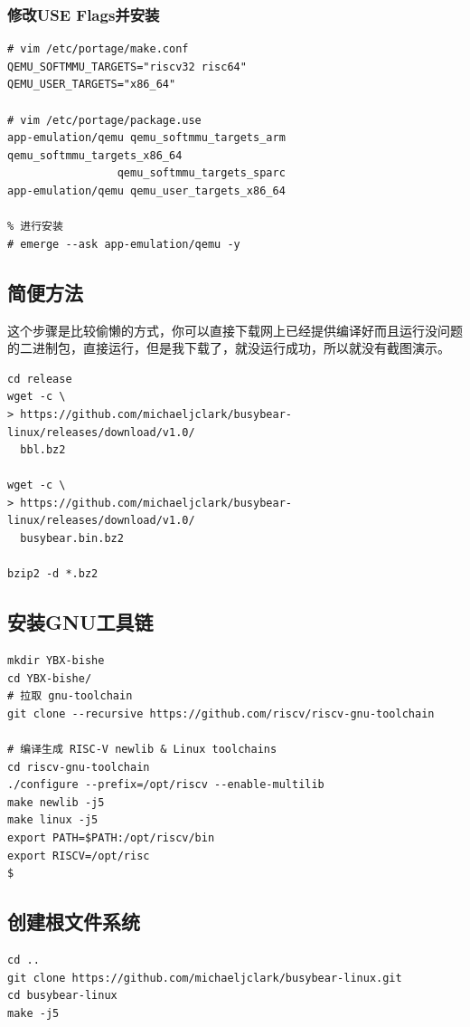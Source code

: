 \subsubsection{修改USE Flags并安装}
\begin{lstlisting}
# vim /etc/portage/make.conf
QEMU_SOFTMMU_TARGETS="riscv32 risc64"
QEMU_USER_TARGETS="x86_64"

# vim /etc/portage/package.use
app-emulation/qemu qemu_softmmu_targets_arm qemu_softmmu_targets_x86_64 
                 qemu_softmmu_targets_sparc
app-emulation/qemu qemu_user_targets_x86_64

% 进行安装
# emerge --ask app-emulation/qemu -y
\end{lstlisting}

\subsection{简便方法}
这个步骤是比较偷懒的方式，你可以直接下载网上已经提供编译好而且运行没问题的二进制包，直接运行，但是我下载了，就没运行成功，所以就没有截图演示。
\begin{lstlisting}
cd release
wget -c \ 
> https://github.com/michaeljclark/busybear-linux/releases/download/v1.0/
  bbl.bz2

wget -c \
> https://github.com/michaeljclark/busybear-linux/releases/download/v1.0/
  busybear.bin.bz2

bzip2 -d *.bz2
\end{lstlisting}

\subsection{安装GNU工具链}

\begin{lstlisting}
mkdir YBX-bishe
cd YBX-bishe/
# 拉取 gnu-toolchain
git clone --recursive https://github.com/riscv/riscv-gnu-toolchain

# 编译生成 RISC-V newlib & Linux toolchains
cd riscv-gnu-toolchain
./configure --prefix=/opt/riscv --enable-multilib
make newlib -j5
make linux -j5
export PATH=$PATH:/opt/riscv/bin
export RISCV=/opt/risc
$
\end{lstlisting}

\subsection{创建根文件系统}
\begin{lstlisting}
cd ..
git clone https://github.com/michaeljclark/busybear-linux.git
cd busybear-linux
make -j5
\end{lstlisting}

